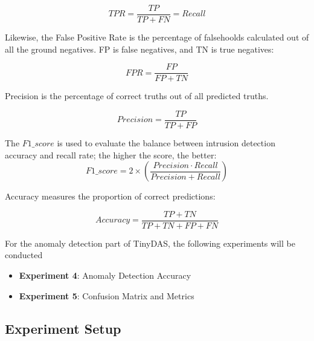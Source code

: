\begin{equation}
    TPR = \frac{TP}{TP + FN} = Recall
\end{equation}
\vspace{0.2cm}

Likewise, the False Positive Rate is the percentage of falsehoolds calculated out of all the ground negatives. FP is false negatives, and TN is true negatives:

\begin{equation}
    FPR = \frac{FP}{FP + TN}
\end{equation}
\vspace{0.2cm}

Precision is the percentage of correct truths out of all predicted truths.

\begin{equation}
    Precision = \frac{TP}{TP + FP}
\end{equation}

\vspace{0.2cm}

The $F1\_{score}$ is used to evaluate the balance between intrusion detection accuracy and recall rate; the higher the score, the better:
\begin{equation}
    F1\_{score} = 2 \times (\frac{Precision \cdot Recall}{Precision + Recall})
\end{equation}

\vspace{0.2cm}

Accuracy measures the proportion of correct predictions:

\begin{equation}
    Accuracy = \frac{TP + TN}{TP + TN + FP + FN}
\end{equation}

\vspace{0.5cm}

For the anomaly detection part of TinyDAS, the following experiments will be conducted

\begin{itemize}
    \item \textbf{Experiment 4}: Anomaly Detection Accuracy
    \item \textbf{Experiment 5}: Confusion Matrix and Metrics
\end{itemize}


\subsection{Experiment Setup}

